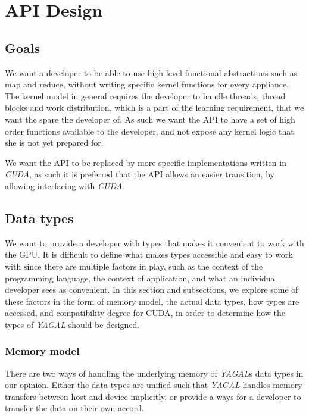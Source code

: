 \section{API Design}
\subsection{Goals}
We want a developer to be able to use high level functional abstractions such as map and reduce, without writing specific kernel functions for every appliance. The kernel model in general requires the developer to handle threads, thread blocks and work distribution, which is a part of the learning requirement, that we want the spare the developer of.
As such we want the API to have a set of high order functions available to the developer, and not expose any kernel logic that she is not yet prepared for.

We want the API to be replaced by more specific implementations written in \textit{CUDA}, as such it is preferred that the API allows an easier transition, by allowing interfacing with \textit{CUDA}.

\subsection{Data types}


We want to provide a developer with types that makes it convenient to work with the GPU. It is difficult to define what makes types accessible and easy to work with since there are multiple factors in play, such as the context of the programming language, the context of application, and what an individual developer sees as convenient. In this section and subsections, we explore some of these factors in the form of memory model, the actual data types, how types are accessed, and compatibility degree for CUDA, in order to determine how the types of \textit{YAGAL} should be designed.

\subsubsection{Memory model}
There are two ways of handling the underlying memory of \textit{YAGAL}s data types in our opinion. Either the data types are unified such that \textit{YAGAL} handles memory transfers between host and device implicitly, or provide a ways for a developer to transfer the data on their own accord. 

